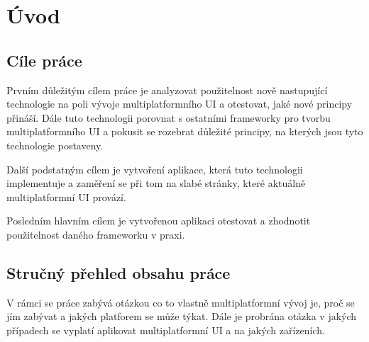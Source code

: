 \chapter{Úvod}
\setcounter{page}{1}


\section{Cíle práce}
Prvním důležitým cílem práce je analyzovat použitelnost nově nastupující technologie na poli vývoje multiplatformního UI a otestovat, jaké
nové principy přináší. Dále tuto technologii porovnat s ostatními frameworky pro tvorbu multiplatformního UI a pokusit se
rozebrat důležité principy, na kterých jsou tyto technologie postaveny. 

Další podstatným cílem je vytvoření aplikace, která tuto technologii implementuje a zaměření se při tom na slabé stránky, 
které aktuálně multiplatformní UI provází.

Posledním hlavním cílem je vytvořenou aplikaci otestovat a zhodnotit použitelnost daného frameworku v praxi.

\section{Stručný přehled obsahu práce}
V rámci se práce zabývá otázkou co to vlastně multiplatformní vývoj je, proč se jím zabývat a jakých platforem se může týkat.
Dále je probrána otázka v jakých případech se vyplatí aplikovat multiplatformní UI a na jakých zařízeních. 

